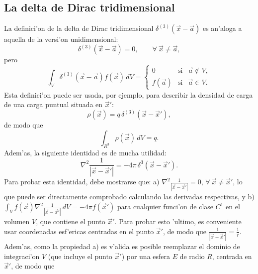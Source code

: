 \subsection{La delta de Dirac tridimensional}
 La definici'on de la delta de Dirac tridimensional $\delta^{(3)}(\vec x-\vec
a)$ es an'aloga a aquella de la versi'on unidimensional:
\begin{equation}
  \delta^{(3)}(\vec x-\vec a) = 0,\qquad \forall\  \vec x\not=\vec a ,
\end{equation}
pero
\begin{equation}
  \int_V \delta^{(3)}(\vec x-\vec a) f(\vec x)\,dV = \left\{\begin{array}{ccl}
 0 & \text{si} & \vec{a}\notin V ,\\
f(\vec{a})& \text{si} & \vec{a}\in V .
\end{array}\right.
\end{equation}
 Esta definici'on puede ser usada, por ejemplo, para describir la densidad
de carga de una carga puntual situada en $\vec{x}'$:
\begin{equation}
  \rho(\vec{x}) = q\,\delta^{(3)}(\vec x-\vec{x}'),
 \end{equation}
de modo que
\begin{equation}
 \int_{R^3}\rho(\vec x)\, dV= q.
\end{equation}
 Adem'as, la siguiente identidad es de mucha utilidad:
\begin{equation}
  \boxed{\nabla^2\frac 1{|\vec x-\vec x'|} = -4\pi\,\delta^3(\vec x-\vec x').}
\label{dreid1}
\end{equation}
Para probar esta identidad, debe mostrarse que: a) $\nabla^2\frac 1{|\vec x-\vec
x'|}=0$, $\forall\ \vec x\not= \vec x'$, lo que puede ser directamente
comprobado calculando las derivadas respectivas, y b)  $\int_V
f(\vec x)\nabla^2\frac 1{|\vec x-\vec x'|}\, dV=-4\pi f(\vec x')$  para
cualquier funci'on de clase $C^1$ en el volumen $V$, que contiene el punto $\vec
x'$. Para probar esto 'ultimo, es conveniente usar coordenadas esf'ericas
centradas en el punto $\vec x'$, de modo que $\frac 1{|\vec x-\vec
x'|}=\frac{1}{r}$. Adem'as, como la propiedad a) es v'alida es posible
reemplazar el dominio de integraci'on $V$ (que incluye el punto $\vec x'$) por
una esfera $E$ de radio $R$, centrada en $\vec x'$, de modo que
